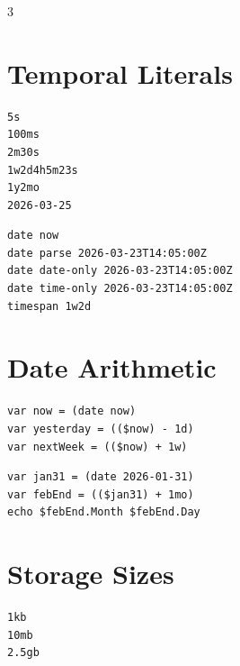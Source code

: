 


\footnotesize
{}

\begin{multicols*}{3}

\section{Temporal Literals}
\begin{lstlisting}
5s
100ms
2m30s
1w2d4h5m23s
1y2mo
2026-03-25
\end{lstlisting}


\begin{lstlisting}
date now
date parse 2026-03-23T14:05:00Z
date date-only 2026-03-23T14:05:00Z
date time-only 2026-03-23T14:05:00Z
timespan 1w2d
\end{lstlisting}

\section{Date Arithmetic}
\begin{lstlisting}
var now = (date now)
var yesterday = (($now) - 1d)
var nextWeek = (($now) + 1w)
\end{lstlisting}

\begin{lstlisting}
var jan31 = (date 2026-01-31)
var febEnd = (($jan31) + 1mo)
echo $febEnd.Month $febEnd.Day
\end{lstlisting}


\section{Storage Sizes}
\begin{lstlisting}
1kb
10mb
2.5gb
\end{lstlisting}


\end{multicols*}
